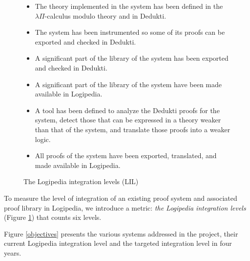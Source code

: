 \begin{figure}[t]
\begin{framed}
\begin{itemize}
\item[LIL 1:]
The theory implemented in the system has been defined in
the $\lambda\Pi$-calculus modulo theory and in {\sf Dedukti}.

\item[LIL 2:]
The system has been instrumented so some of its proofs can be exported
and checked in {\sf Dedukti}.

\item[LIL 3:] A significant part of the library of the system has been
  exported and checked in {\sf Dedukti}.

\item[LIL 4:] A significant part of the library of the system have
  been made available in {\sf Logipedia}.

\item[LIL 5:]
A tool has been defined to analyze the {\sf Dedukti} proofs for the system,
detect those that can be expressed in a theory weaker than that of the
system, and translate those proofs into a weaker logic.

\item[LIL 6:]
All proofs of the system have been exported, translated,
and made available in {\sf Logipedia}.
\end{itemize}
\caption{The {\sf Logipedia} integration levels (LIL)\label{lil}}
\end{framed}
\end{figure}

To measure the level of integration of an existing proof system and
associated proof library in {\sf Logipedia}, we introduce a metric:
{\em the {\sf Logipedia} integration levels} (Figure \ref{lil}) that
counts six levels.  


Figure \ref{objectives} presents the various systems addressed in the
project, their current {\sc Logipedia} integration level and the
targeted integration level in four years.


